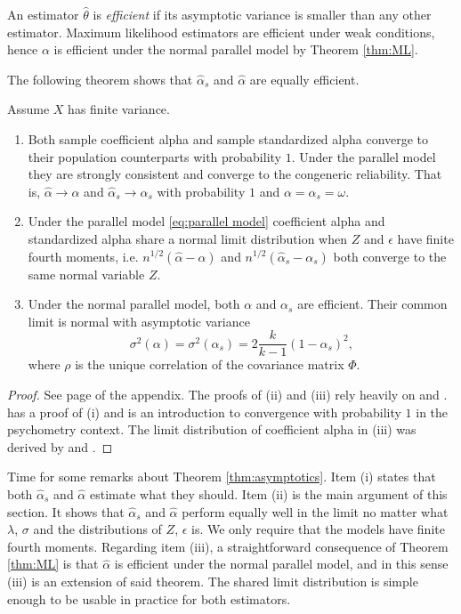 \documentclass[twoside]{article}
\begin{document}
An estimator $\hat{\theta}$ is \textit{efficient} \citep[][Section 4.3]{Lehmann2004-ke} if its asymptotic variance is smaller than any other estimator. Maximum likelihood estimators are efficient under weak conditions, hence $\alpha$ is efficient under the normal parallel model by Theorem \ref{thm:ML}.  

The following theorem shows that $\hat{\alpha}_s$ and $\hat{\alpha}$ are equally efficient.

\begin{thm}
\label{thm:asymptotics}
Assume $X$ has finite variance. 
\begin{enumerate}[label=(\roman*)]
    \item Both sample coefficient alpha and sample standardized alpha converge to their population counterparts with probability $1$. Under the parallel model they are strongly consistent and converge to the congeneric reliability. That is, $\hat{\alpha}\to\alpha$ and $\hat{\alpha}_s\to\alpha_s$ with probability $1$ and $\alpha = \alpha_s = \omega$.
    \item Under the parallel model \eqref{eq:parallel model} coefficient alpha and standardized alpha share a normal limit distribution when $Z$ and $\epsilon$ have finite fourth moments, i.e. $n^{1/2}(\hat{\alpha} - \alpha)$ and  $n^{1/2}(\hat{\alpha}_s - \alpha_s)$ both converge to the same normal variable $Z$.
    \item Under the normal parallel model, both $\alpha$ and $\alpha_s$ are efficient. Their common limit is normal with asymptotic variance 
    $$\sigma^{2}\left(\alpha\right)= \sigma^{2}\left(\alpha_{s}\right)=2\frac{k}{k-1}\left(1-\alpha_{s}\right)^{2},$$
    where $\rho$ is the unique correlation of the covariance matrix $\Phi$.
\end{enumerate}
\end{thm}    
\begin{proof}
See page \pageref{proof:asymptotics} of the appendix. The proofs of (ii) and (iii) rely heavily on \citep{Van_Zyl2000-si} and \citep{hayashi2005note}. \citep{Raykov2019-tv} has a proof of (i) and is an introduction to convergence with probability $1$ in the psychometry context. The limit distribution of coefficient alpha in (iii) was derived by \citet[][eq. 13]{Van_Zyl2000-si} and \citet[][eq. 58]{Kristof1963-tb}.
\end{proof}

Time for some remarks about Theorem \ref{thm:asymptotics}. Item (i) states that both $\hat{\alpha}_s$ and $\hat{\alpha}$ estimate what they should. Item (ii) is the main argument of this section. It shows that $\hat{\alpha}_{s}$ and $\hat{\alpha}$ perform equally well in the limit no matter what $\lambda$, $\sigma$ and the distributions of $Z$, $\epsilon$ is. We only require that the models have finite fourth moments. Regarding item (iii), a straightforward consequence of Theorem \ref{thm:ML} is that $\hat{\alpha}$ is efficient under the normal parallel model, and in this sense (iii) is an extension of said theorem. The shared limit distribution is simple enough to be usable in practice for both estimators. 
\end{document}
